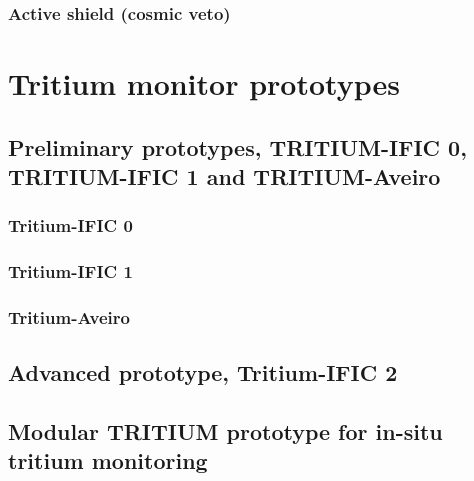 \documentclass[12pt,a4paper]{book}
\begin{document}
	\subsection{Active shield (cosmic veto)} %
	\label{subsec:CharacterizationActiveShield}

\chapter{Tritium monitor prototypes}\label{chap:Prototypes}	
	
	\section[Preliminary prototypes]{Preliminary prototypes, TRITIUM-IFIC 0, TRITIUM-IFIC 1 and TRITIUM-Aveiro}\label{sec:Preliminary_prototypes}
		\subsection{Tritium-IFIC 0}
		\label{subsec:TritiumIFIC0}
		
		\subsection{Tritium-IFIC 1}
		\label{subsec:TritiumIFIC1}
		
		\subsection{Tritium-Aveiro}
		\label{subsec:TritiumAveiro}
		\newpage
		
	\section[Tritium-IFIC 2]{Advanced prototype, Tritium-IFIC 2}
	\label{sec:TritiumIFIC2}
	\newpage
		
	\section[Modular TRITIUM prototype]{Modular TRITIUM prototype for in-situ tritium monitoring}
	\label{sec:TritiumMonitor}
	\newpage
\end{document}
